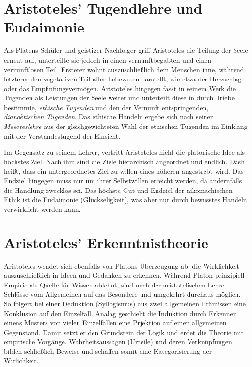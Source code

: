 \section*{Aristoteles' Tugendlehre und Eudaimonie}

Als Platons Schüler und geistiger Nachfolger griff Aristoteles die Teilung der Seele erneut auf,
unterteilte sie jedoch in einen vernunftbegabten und einen vernunftlosen Teil.
Ersterer wohnt auszuschließlich dem Menschen inne, während letzterer den vegetativen Teil aller Lebewesen darstellt,
wie etwa der Herzschlag oder das Empfinfungsvermögen.
Aristoteles hingegen fasst in seinem Werk \cite{nikethik} die Tugenden als Leistungen der Seele weiter und unterteilt
diese in durch Triebe bestimmte, \textit{ethische Tugenden} und den der Vernunft entspringenden, \textit{dianoёtischen Tugenden}.
Das ethische Handeln ergebe sich nach seiner \textit{Mesoteslehre} aus der gleichgewichteten Wahl der ethischen Tugenden
im Einklang mit der Verstandestugend der Einsicht. 

Im Gegensatz zu seinem Lehrer, vertritt Aristoteles nicht die platonische Idee als höchstes Ziel.
Nach ihm sind die Ziele hierarchisch angeordnet und endlich. 
Dash heißt, dass ein untergeordnetes Ziel zu willen eines höheren angestrebt wird.
Das Endziel hingegen muss nur um ihrer Selbstwillen erreicht werden, da andernfalls die Handlung zwecklos sei.
Das höchste Gut und Endziel der nikomachischen Ethik ist die Eudaimonie (Glückseligkeit), 
was aber nur durch bewusstes Handeln verwirklicht werden kann.

\section*{Aristoteles' Erkenntnistheorie}

Aristoteles wendet sich ebenfalls von Platons Überzeugung ab, die Wirklichkeit auszuschließlich in Ideen und Gedanken zu erkennen.
Während Platon prinzipiell Empirie als Quelle für Wissen ablehnt, sind nach der aristotelischen Lehre 
Schlüsse vom Allgemeinen auf das Besondere und umgekehrt durchaus möglich. 
So folgert bei einer Deduktion (Syllogismus) aus zwei allgemeinen Prämissen eine Konklusion auf den Einzelfall.
Analag geschieht die Induktion durch Erkennen einens Musters von vielen Einzelfällen eine Prjektion auf einen allgemeinen Gegenstand.
Damit setzt er den Grundstein der Logik und erdet die Theorie mit empirische Vorgänge.
Wahrheitsaussagen (Urteile) und deren Verknüpfungen bilden schließlich Beweise und schaffen somit eine Kategorisierung der Wirlichkeit.




